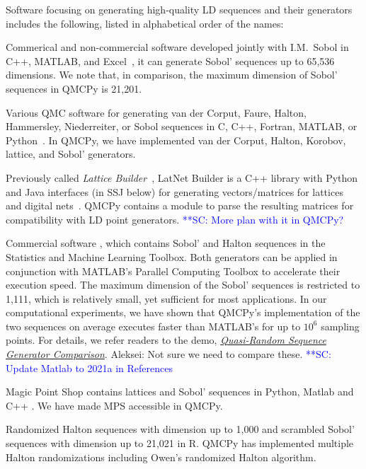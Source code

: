 \documentclass[graybox,footinfo]{svmult}
\newcommand{\scnote}[1]{ {\textcolor{blue}  {\mbox{**SC:} #1}}}
\newcommand{\AGSComment}[1]{{\color{cyan} Aleksei: #1}}
\begin{document}
Software focusing on generating high-quality LD sequences and their generators includes the following, listed in alphabetical order of the names:
\begin{description}[format=\textup,format=\textbf]
	\item[BRODA] Commerical and non-commercial software developed jointly with I.M.~Sobol in C++, MATLAB, and Excel~\cite{BRODA20a}, it can generate Sobol' sequences up to 65,536 dimensions. We note that, in comparison, the maximum dimension of Sobol' sequences in QMCPy is 21,201.	
	\item[Burkhardt] Various QMC software for generating van der Corput, Faure, Halton, Hammersley,  Niederreiter, or Sobol sequences in C, C++, Fortran, MATLAB, or Python~\cite{Bur20a}. In QMCPy, we have implemented van der Corput, Halton, Korobov, lattice, and Sobol' generators.
	\item[LatNet Builder] Previously called \emph{Lattice Builder}~\cite{l2016algorithm}, LatNet Builder is a C++ library with Python and Java interfaces (in SSJ below) for generating vectors/matrices for lattices and digital nets~\cite{LEcEtal22a,LatNet}. QMCPy  contains a module to parse the resulting matrices for compatibility with LD point generators. %
	\scnote{More plan with it in QMCPy?}
	\item[MATLAB] Commercial software \cite{MAT9.9}, which contains Sobol' and Halton sequences in the Statistics and Machine Learning Toolbox. Both generators can be applied in conjunction with MATLAB's Parallel Computing Toolbox to accelerate their execution speed. The maximum dimension of the Sobol' sequences is restricted to 1,111, which is relatively small, yet sufficient for most applications. In our computational experiments, we have shown that QMCPy's implementation of the two sequences on average executes faster than MATLAB's for up to $10^6$ sampling points. For details, we refer readers to the demo, \href{https://qmcpy.readthedocs.io/en/latest/demo_rst/quasirandom_generators.html}{\emph{Quasi-Random Sequence Generator Comparison}}. \AGSComment{Not sure we need to compare these.} \scnote{Update Matlab to 2021a in References}
	\item[MPS] Magic Point Shop contains lattices and Sobol' sequences in Python, Matlab and C++ \cite{Nuy17a}. We have made MPS accessible in QMCPy.
	\item[Owen] Randomized Halton sequences with dimension up to 1,000 \cite{Owe20a} and scrambled Sobol' sequences with dimension up to 21,021  \cite{owen2021r, owen1998scrambling}  in R. QMCPy has implemented multiple Halton randomizations including Owen's randomized Halton algorithm.

\end{description}
\end{document}
